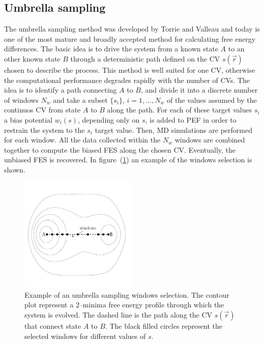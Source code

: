 \subsection{Umbrella sampling}
The umbrella sampling method was developed by Torrie and Valleau and today is one of the most mature and broadly
accepted method for calculating free energy differences. The basic idea is to drive the system from a known state
$A$ to an other known state $B$ through a deterministic path defined on the \ac{CV} $s(\vec r)$ chosen to
describe the process. This method is well suited for one \ac{CV}, otherwise the computational performance
degrades rapidly with the number of \acp{CV}. The idea is to identify a path connecting $A$ to $B$, and divide it
into a discrete number of windows $N_w$ and take a subset $\{s_i\}$, $i=1,\dots,N_w$ of the values assumed by the
continuos \ac{CV} from state $A$ to $B$ along the path. For each of these target values $s_i$ a bias potential
$w_i(s)$, depending only on $s$, is added to \ac{PEF} in order to restrain the system to the $s_i$ target value.
Then, \ac{MD} simulations are performed for each window. All the data collected within the $N_w$ windows are
combined together to compute the biased \ac{FES} along the chosen \ac{CV}. Eventually, the unbiased \ac{FES} is
recovered. In figure~(\ref{fig:umbrellaPath}) an example of the windows selection is shown.
\begin{figure}
	\centering
	\includegraphics[width=0.5\textwidth]{./img/umbrellaPath/umbrellaPath.pdf}
	\caption{Example of an umbrella sampling windows selection. The contour plot represent a $2$--minima free energy profile through which the system is evolved. The dashed line is the path along the \acs{CV} $s(\vec r)$ that connect state $A$ to $B$. The black filled circles represent the selected windows for different values of $s$.}
	\label{fig:umbrellaPath}
\end{figure}

